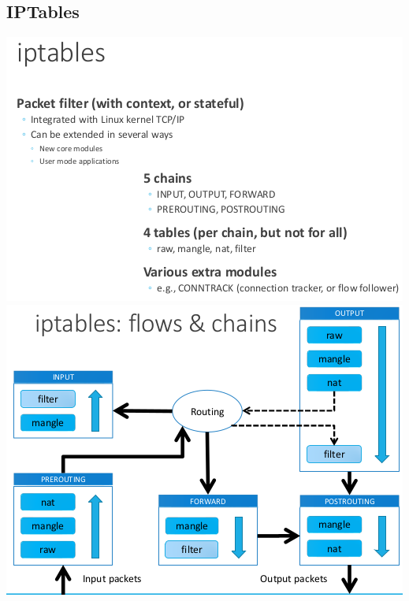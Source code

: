 \documentclass{article}
\begin{document}
\subsection{IPTables}

\begin{center}
  \includegraphics[scale=0.35]{59}
  \includegraphics[scale=0.35]{60}
\end{center}

\pagebreak
\end{document}
